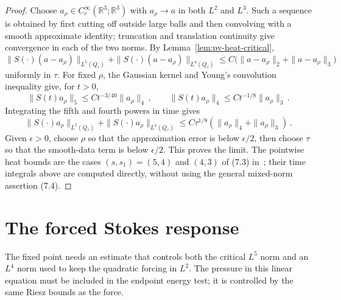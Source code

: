\documentclass[11pt,letterpaper]{article}
\numberwithin{equation}{section}
\theoremstyle{plain}
\theoremstyle{definition}
\theoremstyle{remark}
\begin{document}
\begin{proof}
Choose $a_\rho\in C_c^\infty(\mathbb R^3;\mathbb R^3)$ with $a_\rho\to a$ in both $L^2$ and $L^3$. Such a sequence is obtained by first cutting off outside large balls and then convolving with a smooth approximate identity; truncation and translation continuity give convergence in each of the two norms. By Lemma~\ref{lem:pv-heat-critical},
\begin{equation*}
\|S(\cdot)(a-a_\rho)\|_{L^5(Q_\tau)}+\|S(\cdot)(a-a_\rho)\|_{L^4(Q_\tau)}\le C\bigl(\|a-a_\rho\|_2+\|a-a_\rho\|_3\bigr)
\end{equation*}
uniformly in $\tau$. For fixed $\rho$, the Gaussian kernel and Young's convolution inequality give, for $t>0$,
\begin{equation*}
\|S(t)a_\rho\|_5\le Ct^{-3/40}\|a_\rho\|_4\,,\qquad
 \|S(t)a_\rho\|_4\le Ct^{-1/8}\|a_\rho\|_3\,.
\end{equation*}
Integrating the fifth and fourth powers in time gives
\begin{equation*}
\|S(\cdot)a_\rho\|_{L^5(Q_\tau)}+\|S(\cdot)a_\rho\|_{L^4(Q_\tau)}
 \le C\tau^{1/8}(\|a_\rho\|_4+\|a_\rho\|_3)\,.
\end{equation*}
Given $\epsilon>0$, choose $\rho$ so that the approximation error is below $\epsilon/2$, then choose $\tau$ so that the smooth-data term is below $\epsilon/2$. This proves the limit. The pointwise heat bounds are the cases $(s,s_1)=(5,4)$ and $(4,3)$ of (7.3) in~\cite[printed p.~243]{ESS2003}; their time integrals above are computed directly, without using the general mixed-norm assertion (7.4).
\end{proof}

\section{The forced Stokes response}\label{sec:pv-stokes}

The fixed point needs an estimate that controls both the critical $L^5$ norm and an $L^4$ norm used to keep the quadratic forcing in $L^2$. The pressure in this linear equation must be included in the endpoint energy test; it is controlled by the same Riesz bounds as the force.
\end{document}
